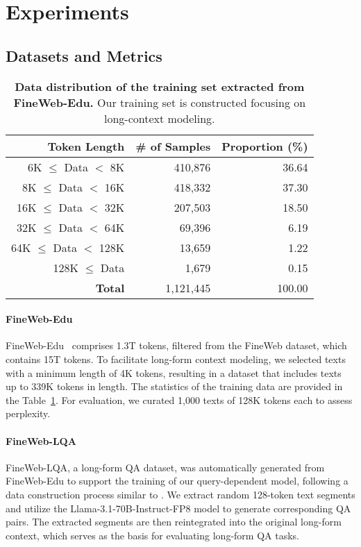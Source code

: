 \section{Experiments}

\subsection{Datasets and Metrics}
\begin{table}[h]
\small
\centering
\begin{tabular}{rrr}
\toprule
\textbf{Token Length} & \textbf{\# of Samples} & \textbf{Proportion (\%)} \\ \midrule
6K $\leq$ Data $<$ 8K & 410,876 & 36.64 \\
8K $\leq$ Data $<$ 16K & 418,332  & 37.30 \\
16K $\leq$ Data $<$ 32K & 207,503 & 18.50 \\
32K $\leq$ Data $<$ 64K & 69,396 & 6.19 \\
64K $\leq$ Data $<$ 128K & 13,659 & 1.22 \\
128K $\leq$ Data & 1,679 & 0.15 \\ \midrule
\textbf{Total} & 1,121,445 & 100.00 \\ \bottomrule
\end{tabular}
\caption{
\textbf{Data distribution of the training set extracted from FineWeb-Edu.} Our training set is constructed focusing on long-context modeling.
}
\label{tab:data_stats}
\end{table}

\paragraph{FineWeb-Edu}
FineWeb-Edu~\cite{finewebedu} comprises 1.3T tokens, filtered from the FineWeb dataset, which contains 15T tokens. To facilitate long-form context modeling, we selected texts with a minimum length of 4K tokens, resulting in a dataset that includes texts up to 339K tokens in length. The statistics of the training data are provided in the Table~\ref{tab:data_stats}. For evaluation, we curated 1,000 texts of 128K tokens each to assess perplexity.

\paragraph{FineWeb-LQA}
FineWeb-LQA, a long-form QA dataset, was automatically generated from FineWeb-Edu to support the training of our query-dependent model, following a data construction process similar to \citet{in2}. We extract random 128-token text segments and utilize the Llama-3.1-70B-Instruct-FP8 model to generate corresponding QA pairs. The extracted segments are then reintegrated into the original long-form context, which serves as the basis for evaluating long-form QA tasks.

